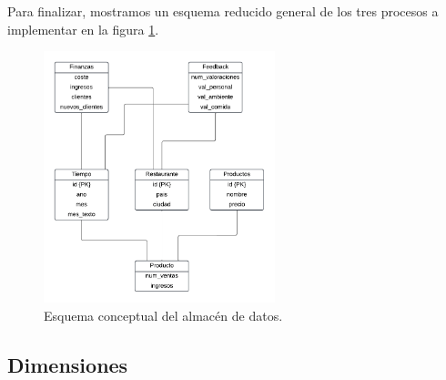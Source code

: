 \documentclass[12pt]{opticajnl}
\begin{document}
Para finalizar, mostramos un esquema reducido general de los tres procesos a implementar en la figura \ref{fig:esquema_almacen}.

\begin{figure}[H]
\centering
\includegraphics[width=0.6\textwidth]{fotos/3.pdf}
\caption{Esquema conceptual del almacén de datos.}
\label{fig:esquema_almacen}
\end{figure}


\subsection{Dimensiones} \label{sec:3b}
\end{document}
